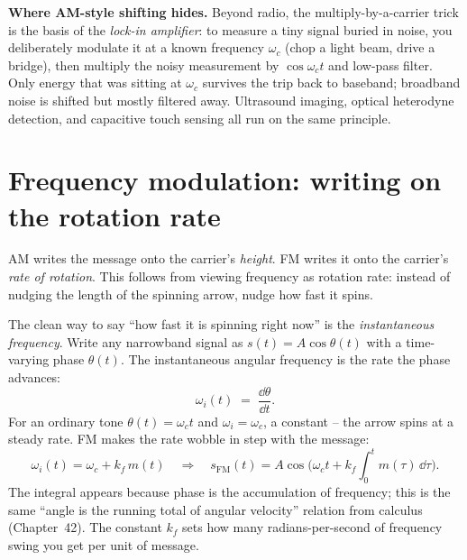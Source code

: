 \begin{applicationbox}
\textbf{Where AM-style shifting hides.} Beyond radio, the multiply-by-a-carrier trick is
the basis of the \emph{lock-in amplifier}: to measure a tiny signal buried in noise, you
deliberately modulate it at a known frequency $\omega_c$ (chop a light beam, drive a
bridge), then multiply the noisy measurement by $\cos\omega_c t$ and low-pass filter.
Only energy that was sitting at $\omega_c$ survives the trip back to baseband; broadband
noise is shifted but mostly filtered away. Ultrasound imaging, optical heterodyne
detection, and capacitive touch sensing all run on the same principle.
\end{applicationbox}

\section{Frequency modulation: writing on the rotation rate}
\label{ch23:fm}

AM writes the message onto the carrier's \emph{height}. FM writes it onto the carrier's
\emph{rate of rotation}. This follows from viewing
frequency as rotation rate: instead of nudging the length of the spinning arrow,
nudge how fast it spins.

The clean way to say ``how fast it is spinning right now'' is the \emph{instantaneous
frequency}. Write any narrowband signal as $s(t)=A\cos\theta(t)$ with a time-varying
phase $\theta(t)$. The instantaneous angular frequency is the rate the phase advances:
\begin{equation}
\label{ch23:instfreq}
\omega_i(t) \;=\; \frac{\dd \theta}{\dd t}.
\end{equation}
For an ordinary tone $\theta(t)=\omega_c t$ and $\omega_i=\omega_c$, a constant -- the arrow
spins at a steady rate. FM makes the rate wobble in step with the message:
\begin{equation}
\label{ch23:fmdef}
\omega_i(t) = \omega_c + k_f\, m(t)
\quad\Longrightarrow\quad
s_{\text{FM}}(t) = A\cos\!\Big(\omega_c t + k_f\!\int_0^t m(\tau)\,\dd\tau\Big).
\end{equation}
The integral appears because phase is the accumulation of frequency; this is the same
``angle is the running total of angular velocity'' relation from calculus (Chapter~42).
The constant $k_f$ sets how many radians-per-second of frequency swing you get per unit
of message.


